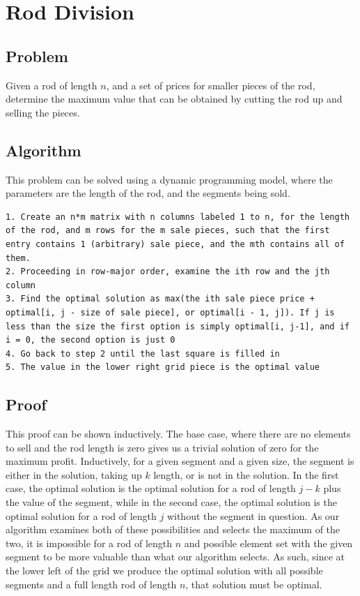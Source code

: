 \documentclass[titlepage]{article}
\numberwithin{equation}{subsection}
\begin{document}
\section{Rod Division}
\subsection{Problem}
Given a rod of length $n$, and a set of prices for smaller pieces of the rod, determine the maximum value that can be obtained
by cutting the rod up and selling the pieces.
\subsection{Algorithm}
This problem can be solved using a dynamic programming model, where the parameters are the length of the rod, and the segments being sold.
\begin{lstlisting}
1. Create an n*m matrix with n columns labeled 1 to n, for the length of the rod, and m rows for the m sale pieces, such that the first entry contains 1 (arbitrary) sale piece, and the mth contains all of them.
2. Proceeding in row-major order, examine the ith row and the jth column 
3. Find the optimal solution as max(the ith sale piece price + optimal[i, j - size of sale piece], or optimal[i - 1, j]). If j is less than the size the first option is simply optimal[i, j-1], and if i = 0, the second option is just 0
4. Go back to step 2 until the last square is filled in
5. The value in the lower right grid piece is the optimal value
\end{lstlisting}
\subsection{Proof}
This proof can be shown inductively. The base case, where there are no elements to sell and the rod length is zero gives us a trivial solution of
zero for the maximum profit. Inductively, for a given segment and a given size, the segment is either in the solution, taking up $k$ length, or is
not in the solution. In the first case, the optimal solution is the optimal solution for a rod of length $j-k$ plus the value of the segment,
while in the second case, the optimal solution is the optimal solution for a rod of length $j$ without the segment in question. As our algorithm examines both of these
possibilities and selects the maximum of the two, it is impossible for a rod of length $n$ and possible element set with the given segment
to be more valuable than what our algorithm selects. As such, since at the lower left of the grid we produce the optimal solution with
all possible segments and a full length rod of length $n$, that solution must be optimal.
\end{document}
